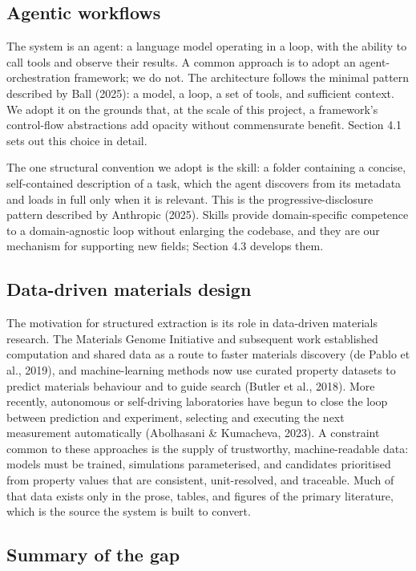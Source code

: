 \documentclass{template}
\begin{document}
\subsection{Agentic workflows}

The system is an agent: a language model operating in a loop, with the ability to call tools and observe their results. A common approach is to adopt an agent-orchestration framework; we do not. The architecture follows the minimal pattern described by Ball (2025): a model, a loop, a set of tools, and sufficient context. We adopt it on the grounds that, at the scale of this project, a framework's control-flow abstractions add opacity without commensurate benefit. Section 4.1 sets out this choice in detail.

The one structural convention we adopt is the skill: a folder containing a concise, self-contained description of a task, which the agent discovers from its metadata and loads in full only when it is relevant. This is the progressive-disclosure pattern described by Anthropic (2025). Skills provide domain-specific competence to a domain-agnostic loop without enlarging the codebase, and they are our mechanism for supporting new fields; Section 4.3 develops them.

\subsection{Data-driven materials design}

The motivation for structured extraction is its role in data-driven materials research. The Materials Genome Initiative and subsequent work established computation and shared data as a route to faster materials discovery (de Pablo et al., 2019), and machine-learning methods now use curated property datasets to predict materials behaviour and to guide search (Butler et al., 2018). More recently, autonomous or self-driving laboratories have begun to close the loop between prediction and experiment, selecting and executing the next measurement automatically (Abolhasani \& Kumacheva, 2023). A constraint common to these approaches is the supply of trustworthy, machine-readable data: models must be trained, simulations parameterised, and candidates prioritised from property values that are consistent, unit-resolved, and traceable. Much of that data exists only in the prose, tables, and figures of the primary literature, which is the source the system is built to convert.

\subsection{Summary of the gap}
\end{document}
